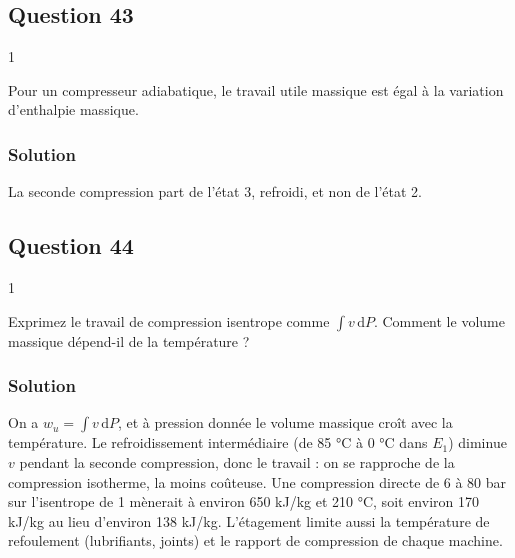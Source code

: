 \documentclass[11pt,a4paper]{article}
\newcommand{\equationajustee}[1]{%
  \sbox{\boiteequation}{$\displaystyle #1$}%
  \ifdim\wd\boiteequation>\linewidth
    \[\resizebox{\linewidth}{!}{\usebox{\boiteequation}}\]%
  \else
    \[#1\]%
  \fi}
\begin{document}
\hypertarget{question-43}{%
\subsection{Question 43}\label{question-43}}

\begin{indication}{1}

Pour un compresseur adiabatique, le travail utile massique est égal à la variation d'enthalpie massique.

\end{indication}

\hypertarget{solution-42}{%
\subsubsection{Solution}\label{solution-42}}

\equationajustee{\mathcal P_{\text{comp}}=D_m\big[(h_2-h_1)+(h_4-h_3)\big]=0{,}1\times(67+71)}

\equationajustee{\boxed{\mathcal P_{\text{comp}}\approx14\ \text{kW}}}

\begin{piege}

La seconde compression part de l'état 3, refroidi, et non de l'état 2.

\end{piege}

\hypertarget{question-44}{%
\subsection{Question 44}\label{question-44}}

\begin{indication}{1}

Exprimez le travail de compression isentrope comme \(\int v\,\mathrm dP\). Comment le volume massique dépend-il de la température ?

\end{indication}

\hypertarget{solution-43}{%
\subsubsection{Solution}\label{solution-43}}

On a \(w_u=\int v\,\mathrm dP\), et à pression donnée le volume massique croît avec la température. Le refroidissement intermédiaire (de 85 °C à 0 °C dans \(E_1\)) diminue \(v\) pendant la seconde compression, donc le travail : on se rapproche de la compression isotherme, la moins coûteuse. Une compression directe de 6 à 80 bar sur l'isentrope de 1 mènerait à environ 650 kJ/kg et 210 °C, soit environ 170 kJ/kg au lieu d'environ 138 kJ/kg. L'étagement limite aussi la température de refoulement (lubrifiants, joints) et le rapport de compression de chaque machine.
\end{document}
